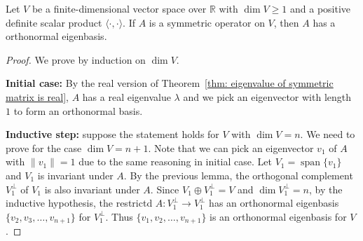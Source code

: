 \documentclass{ctexart}
\newcommand{\R}{\mathbb{R}}
\begin{document}
    \begin{mythm}\label{thm: real version of spectral theorem}
        Let $V$ be a finite-dimensional vector space over $\R$ with $\dim V\ge 1$ and a positive definite scalar product $\langle \cdot, \cdot \rangle$. If $A$ is a symmetric operator on $V$, then $A$ has a orthonormal eigenbasis.
    \end{mythm}
    \begin{proof}
        We prove by induction on $\dim V$.

        \textbf{Initial case:} By the real version of Theorem~\ref{thm: eigenvalue of symmetric matrix is real}, $A$ has a real eigenvalue $\lambda$ and we pick an eigenvector with length $1$ to form an orthonormal basis.

        \textbf{Inductive step:} suppose the statement holds for $V$ with $\dim V=n$. We need to prove for the case $\dim V=n+1$. Note that we can pick an eigenvector $v_1$ of $A$ with $\| v_1 \| = 1 $ due to the same reasoning in initial case. Let $V_1 = \operatorname{span} \{ v_1 \}$ and $V_1$ is invariant under $A$. By the previous lemma, the orthogonal complement $V_1^\perp$ of $V_1$ is also invariant under $A$. Since $V_1 \oplus V_1^\perp = V$ and $\dim V_1^\perp = n$, by the inductive hypothesis, the restrictd $A: V_1^\perp \to V_1^\perp$ has an orthonormal eigenbasis $\{v_2, v_3, \ldots, v_{n+1}\}$ for $V_1^\perp$. Thus $\{v_1, v_2, \ldots, v_{n+1}\}$ is an orthonormal eigenbasis for $V$.
    \end{proof}
\end{document}
